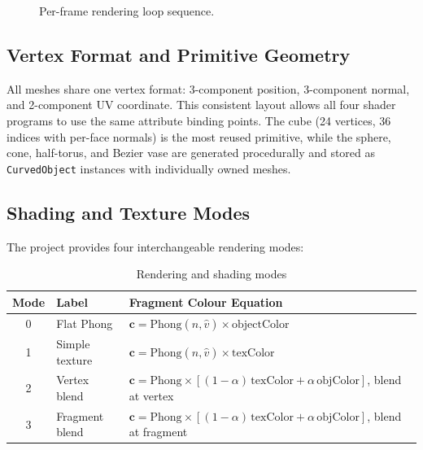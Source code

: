 \documentclass[12pt, a4paper]{article}
\begin{document}
\begin{figure}[H]
\centering
{}
\caption{Per-frame rendering loop sequence.}
\label{fig:pipeline}
\end{figure}

\subsection{Vertex Format and Primitive Geometry}

All meshes share one vertex format: 3-component position, 3-component normal, and 2-component UV coordinate. This consistent layout allows all four shader programs to use the same attribute binding points. The cube (24 vertices, 36 indices with per-face normals) is the most reused primitive, while the sphere, cone, half-torus, and Bezier vase are generated procedurally and stored as \texttt{CurvedObject} instances with individually owned meshes.

\subsection{Shading and Texture Modes}

The project provides four interchangeable rendering modes:

\begin{table}[H]
    \centering
    \caption{Rendering and shading modes}
    \begin{tabular}{clp{7.2cm}}
        \toprule
        \textbf{Mode} & \textbf{Label} & \textbf{Fragment Colour Equation} \\
        \midrule
        0 & Flat Phong & $\mathbf{c} = \text{Phong}(\hat{n},\hat{v})\times\text{objectColor}$ \\
        1 & Simple texture & $\mathbf{c} = \text{Phong}(\hat{n},\hat{v})\times\text{texColor}$ \\
        2 & Vertex blend & $\mathbf{c} = \text{Phong}\times[(1{-}\alpha)\,\text{texColor}+\alpha\,\text{objColor}]$, blend at vertex \\
        3 & Fragment blend & $\mathbf{c} = \text{Phong}\times[(1{-}\alpha)\,\text{texColor}+\alpha\,\text{objColor}]$, blend at fragment \\
        \bottomrule
    \end{tabular}
    \label{tab:shading}
\end{table}
\end{document}
